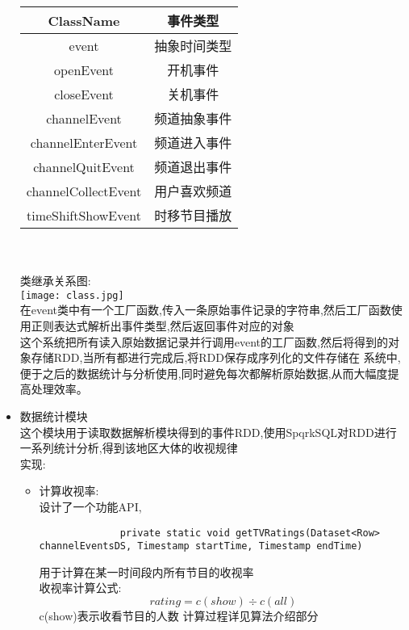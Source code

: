 \documentclass{hitreport}
\begin{document}
\begin{itemize}
\begin{tabular}{|c|c|}
          \hline
          ClassName           & 事件类型     \\ \hline
          event               & 抽象时间类型 \\ \hline
          openEvent           & 开机事件     \\ \hline
          closeEvent          & 关机事件     \\ \hline
          channelEvent        & 频道抽象事件 \\ \hline
          channelEnterEvent   & 频道进入事件 \\ \hline
          channelQuitEvent    & 频道退出事件 \\ \hline
          channelCollectEvent & 用户喜欢频道 \\ \hline
          timeShiftShowEvent  & 时移节目播放 \\ \hline
        \end{tabular}\\
        ~\\ \newpage
        类继承关系图:\\
        \texttt{[image: class.jpg]}\\
        在event类中有一个工厂函数,传入一条原始事件记录的字符串,然后工厂函数使用正则表达式解析出事件类型,然后返回事件对应的对象\\
        这个系统把所有读入原始数据记录并行调用event的工厂函数,然后将得到的对象存储RDD,当所有都进行完成后,将RDD保存成序列化的文件存储在
        系统中,便于之后的数据统计与分析使用,同时避免每次都解析原始数据,从而大幅度提高处理效率。
  \item 数据统计模块\\
        这个模块用于读取数据解析模块得到的事件RDD,使用SpqrkSQL对RDD进行一系列统计分析,得到该地区大体的收视规律\\
        实现:
        \begin{itemize}
          \item 计算收视率: \\
                设计了一个功能API,
                \begin{lstlisting}
              private static void getTVRatings(Dataset<Row> channelEventsDS, Timestamp startTime, Timestamp endTime)
            \end{lstlisting}
                用于计算在某一时间段内所有节目的收视率\\
                收视率计算公式:$$rating = c(show) \div c(all)$$
                c(show)表示收看节目的人数
                计算过程详见算法介绍部分


\end{itemize}
\end{itemize}
\end{document}
